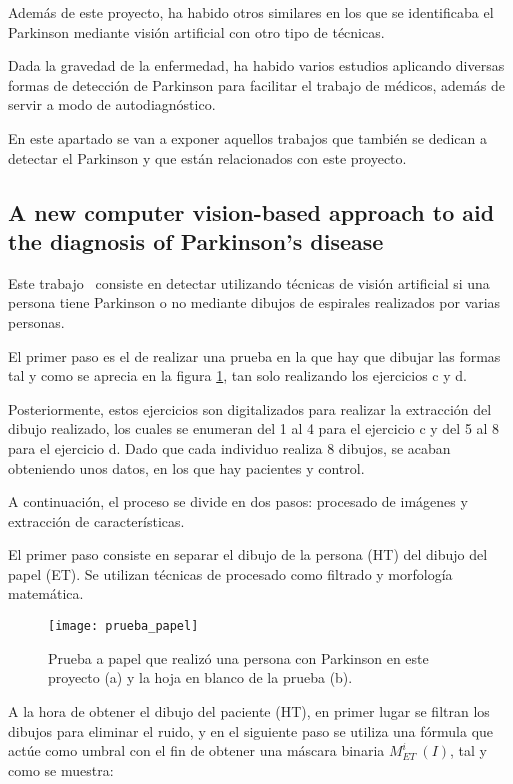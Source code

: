 Además de este proyecto, ha habido otros similares en los que se identificaba el Parkinson mediante visión artificial con otro tipo de técnicas.

Dada la gravedad de la enfermedad, ha habido varios estudios aplicando diversas formas de detección de Parkinson para facilitar el trabajo de médicos, además de servir a modo de autodiagnóstico.

En este apartado se van a exponer aquellos trabajos que también se dedican a detectar el Parkinson y que están relacionados con este proyecto.

\subsection{A new computer vision-based approach to aid the diagnosis of Parkinson's disease}
Este trabajo~\cite{pereira2016new} consiste en detectar utilizando técnicas de visión artificial si una persona tiene Parkinson o no mediante dibujos de espirales realizados por varias personas.

El primer paso es el de realizar una prueba en la que hay que dibujar las formas tal y como se aprecia en la figura \ref{fig:pruebapapel}, tan solo realizando los ejercicios c y d.

Posteriormente, estos ejercicios son digitalizados para realizar la extracción del dibujo realizado, los cuales se enumeran del 1 al 4 para el ejercicio c y del 5 al 8 para el ejercicio d. Dado que cada individuo realiza 8 dibujos, se acaban obteniendo unos datos, en los que hay pacientes y control.

A continuación, el proceso se divide en dos pasos: procesado de imágenes y extracción de características.

El primer paso consiste en separar el dibujo de la persona (HT) del dibujo del papel (ET). Se utilizan técnicas de procesado como filtrado y morfología matemática.

\begin{figure}[ht]
	\texttt{[image: prueba\_papel]}
	\caption{Prueba a papel que realizó una persona con Parkinson en este proyecto (a) y la hoja en blanco de la prueba (b).\cite{pereira2016new}}
	\label{fig:pruebapapel}
\end{figure}

A la hora de obtener el dibujo del paciente (HT), en primer lugar se filtran los dibujos para eliminar el ruido, y en el siguiente paso se utiliza una fórmula que actúe como umbral con el fin de obtener una máscara binaria \(M^{i}_{ET}\ (I)\), tal y como se muestra: 

